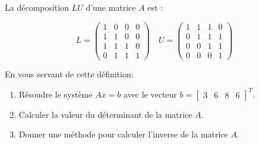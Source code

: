 
La décomposition $L U$ d'une matrice $A$ est :

$$
L=\left(\begin{array}{llll}
1 & 0 & 0 & 0 \\
1 & 1 & 0 & 0 \\
1 & 1 & 1 & 0 \\
0 & 1 & 1 & 1
\end{array}\right) \quad U=\left(\begin{array}{llll}
1 & 1 & 1 & 0 \\
0 & 1 & 1 & 1 \\
0 & 0 & 1 & 1 \\
0 & 0 & 0 & 1
\end{array}\right)
$$


En vous servant de cette définition:
\begin{enumerate}
    \item Résoudre le système $A x=b$ avec le vecteur $b=\left[\begin{array}{llll}3 & 6 & 8 & 6\end{array}\right]^T$.
    \item Calculer la valeur du déterminant de la matrice $A$.
    \item Donner une méthode pour calculer l'inverse de la matrice $A$.
\end{enumerate}


